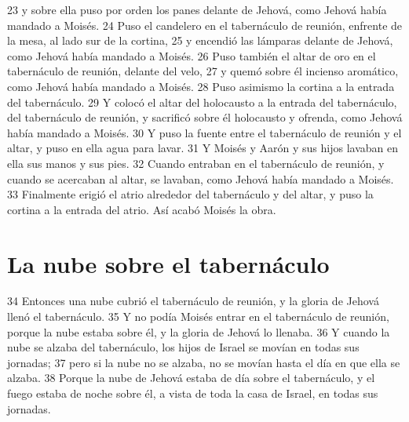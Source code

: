 23 y sobre ella puso por orden los panes delante de Jehová, como Jehová había mandado a Moisés.
24 Puso el candelero en el tabernáculo de reunión, enfrente de la mesa, al lado sur de la cortina,
25 y encendió las lámparas delante de Jehová, como Jehová había mandado a Moisés.
26 Puso también el altar de oro en el tabernáculo de reunión, delante del velo,
27 y quemó sobre él incienso aromático, como Jehová había mandado a Moisés.
28 Puso asimismo la cortina a la entrada del tabernáculo.
29 Y colocó el altar del holocausto a la entrada del tabernáculo, del tabernáculo de reunión, y sacrificó sobre él holocausto y ofrenda, como Jehová había mandado a Moisés.
30 Y puso la fuente entre el tabernáculo de reunión y el altar, y puso en ella agua para lavar.
31 Y Moisés y Aarón y sus hijos lavaban en ella sus manos y sus pies.
32 Cuando entraban en el tabernáculo de reunión, y cuando se acercaban al altar, se lavaban, como Jehová había mandado a Moisés.
33 Finalmente erigió el atrio alrededor del tabernáculo y del altar, y puso la cortina a la entrada del atrio. Así acabó Moisés la obra.

\section*{La nube sobre el tabernáculo}

34 Entonces una nube cubrió el tabernáculo de reunión, y la gloria de Jehová llenó el tabernáculo.
35 Y no podía Moisés entrar en el tabernáculo de reunión, porque la nube estaba sobre él, y la gloria de Jehová lo llenaba.
36 Y cuando la nube se alzaba del tabernáculo, los hijos de Israel se movían en todas sus jornadas;
37 pero si la nube no se alzaba, no se movían hasta el día en que ella se alzaba.
38 Porque la nube de Jehová estaba de día sobre el tabernáculo, y el fuego estaba de noche sobre él, a vista de toda la casa de Israel, en todas sus jornadas.


